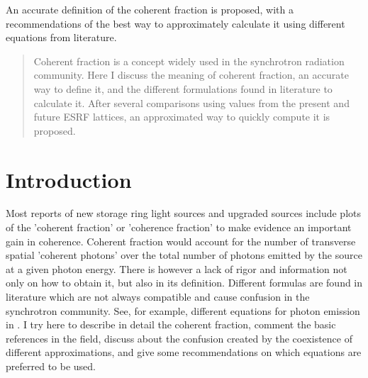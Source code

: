 \documentclass{iucr}              %
\begin{document}
\begin{synopsis}
An accurate definition of the coherent fraction is proposed, with a recommendations of the best way to approximately calculate it using different equations from literature.
\end{synopsis}

\begin{abstract}
Coherent fraction is a concept widely used in the synchrotron radiation community. Here I discuss the meaning of coherent fraction, an accurate way to define it, and the different formulations found in literature to calculate it. After several comparisons using values from the present and future ESRF lattices, an approximated way to quickly compute it is proposed. 
\end{abstract}



\section{Introduction}

Most reports of new storage ring light sources and upgraded sources include plots of the 'coherent fraction' or 'coherence fraction' to make evidence an important gain in coherence. Coherent fraction would account for the number of transverse spatial 'coherent photons' over the total number of photons emitted by the source at a given photon energy. There is however a lack of rigor and information not only on how to obtain it, but also in its definition. Different formulas are found in literature which are not always compatible and cause confusion in the synchrotron community. See, for example, different equations for photon emission in \cite{walker}. I try here to describe in detail the coherent fraction, comment the basic references in the field, discuss about the confusion created by the coexistence of different approximations, and give some recommendations on which equations are preferred to be used. 
\end{document}
